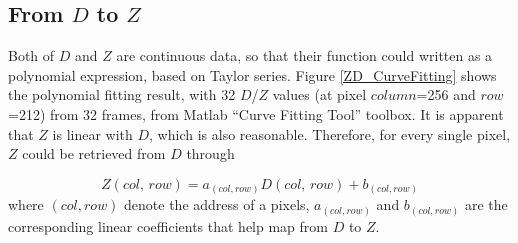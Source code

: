 \subsection{From \(D\) to \(Z\)}
Both of \(D\) and \(Z\) are continuous data, so that their function could written as a polynomial expression, based on Taylor series. Figure \ref{ZD_CurveFitting} shows the polynomial fitting result, with 32 \(D\)/\(Z\) values (at pixel \(column\)=256 and \(row\)=212) from 32 frames, from Matlab \enquote{Curve Fitting Tool} toolbox. It is apparent that \(Z\) is linear with \(D\), which is also reasonable. Therefore, for every single pixel, \(Z\) could be retrieved from \(D\) through \par
%
\begin{equation}
Z(col, \, row) = a_{(col, row)}D(col, \, row)+b_{(col, row)}
\label{fromD_To_Z}
\end{equation}%
%
where \({(col, row)}\) denote the address of a pixels,  \(a_{(col, row)}\) and \(b_{(col, row)}\) are the corresponding linear coefficients that help map from \(D\) to \(Z\).%
%
